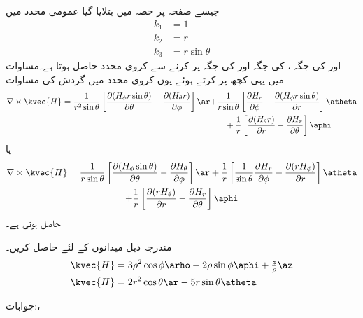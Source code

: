 جیسے صفحہ  پر حصہ  میں بتلایا گیا عمومی محدد میں
\begin{align*}
k_1&=1\\
k_2&=r\\
k_3&= r \sin \theta
\end{align*}
اور  کی جگہ ،  کی جگہ  اور  کی جگہ  پر کرنے سے کروی محدد حاصل ہوتا ہے۔مساوات  میں یہی کچھ پر کرتے ہوئے یوں کروی محدد میں گردش کی مساوات
\begin{align*}
\nabla \times \kvec{H}=\frac{1}{r^2 \sin \theta}\left[\frac{\partial (H_\phi r \sin \theta)}{\partial \theta}-\frac{\partial (H_{\theta} r)}{\partial \phi} \right]\ar+&\frac{1}{r \sin \theta}\left[\frac{\partial H_r }{\partial \phi}-\frac{\partial (H_\phi  r \sin \theta)}{\partial r} \right]\atheta\\
&\quad +\frac{1}{r}\left[\frac{\partial (H_\theta r)}{\partial r}-\frac{\partial H_r }{\partial \theta} \right]\aphi
\end{align*}
یا
\begin{multline}\label{مساوات_مقناطیسی_کروی_گردش}
\nabla \times \kvec{H}=\frac{1}{r \sin \theta}\left[\frac{\partial (H_{\phi}  \sin \theta)}{\partial \theta}-\frac{\partial H_{\theta} }{\partial \phi} \right]\ar+\frac{1}{r }\left[\frac{1}{\sin \theta}\frac{\partial H_r }{\partial \phi}-\frac{\partial (r H_{\phi} )}{\partial r} \right]\atheta
\\
 +\frac{1}{r}\left[\frac{\partial (r H_\theta )}{\partial r}-\frac{\partial H_r }{\partial \theta} \right]\aphi
\end{multline}
حاصل ہوتی ہے۔

مندرجہ ذیل میدانوں کے لئے  حاصل کریں۔
\begin{align*}
\kvec{H}&=3\rho^2\cos\phi\arho-2\rho\sin\phi\aphi+\tfrac{z}{\rho}\az\\
\kvec{H}&=2r^2\cos \theta\ar-5r\sin\theta \atheta
\end{align*}

جوابات:، 

